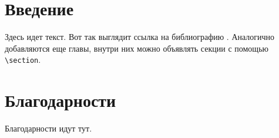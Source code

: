 \documentclass{mipt-thesis-bs}
\begin{document}
\frontmatter
\titlecontents

\mainmatter


\chapter{Введение}

Здесь идет текст. Вот так выглядит ссылка на библиографию \cite{Meneses2012}. Аналогично добавляются еще главы, внутри них можно объявлять секции с помощью \verb|\section|.


\backmatter

\printbib

\chapter{Благодарности}

Благодарности идут тут.
\end{document}

